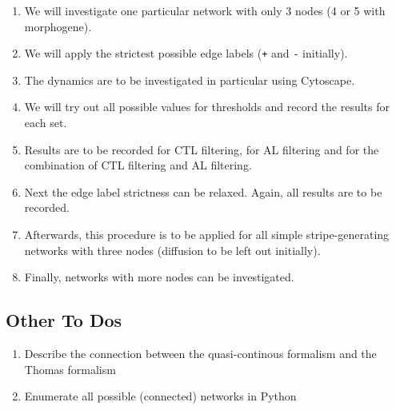 \documentclass{article}
\begin{document}
\begin{flushleft}
\begin{enumerate}
  \item We will investigate one particular network with only 3 nodes (4 or 5
  with morphogene).
  \item We will apply the strictest possible edge labels ({\tt +} and {\tt -}
  initially).
  \item The dynamics are to be investigated in particular using Cytoscape.
  \item We will try out all possible values for thresholds and record the
  results for each set.
  \item Results are to be recorded for CTL filtering, for AL filtering and for
  the combination of CTL filtering and AL filtering.
  \item Next the edge label strictness can be relaxed. Again, all results are to
  be recorded.
  \item Afterwards, this procedure is to be applied for all simple
  stripe-generating networks with three nodes (diffusion to be left out initially).
  \item Finally, networks with more nodes can be investigated.
\end{enumerate}

\subsection{Other To Dos}

\begin{enumerate}
  \item Describe the connection between the quasi-continous formalism and the
  Thomas formalism
  \item Enumerate all possible (connected) networks in Python
\end{enumerate}

\begin{figure}
\end{figure}


\end{flushleft}
\end{document}
